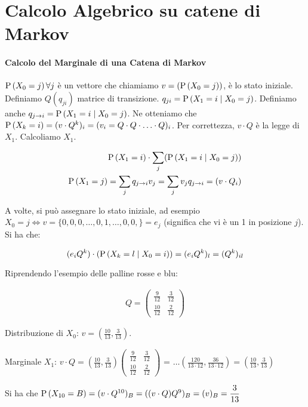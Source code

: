 \section{Calcolo Algebrico su catene di Markov}

\paragraph{Calcolo del Marginale di una Catena di Markov}
$ \text{P}\left(X_0 = j\right) \forall j $ è un vettore che chiamiamo $ v = (\text{P}\left(X_0 = j\right)) $, è lo stato iniziale. Definiamo $ Q(q_{ji}) $ matrice di transizione. $ q_{ji} = \text{P}\left(X_1 = i \mid X_0 = j\right) $. Definiamo anche $ q_{j \to i} = \text{P}\left(X_1 = i \mid X_0 = j\right) $. Ne otteniamo che $ \text{P}\left(X_k = i\right) = (v \cdot Q^k)_i = (v_i = Q \cdot Q \cdot \hdots \cdot Q)_i $. Per correttezza, $ v \cdot Q $ è la legge di $ X_1 $. Calcoliamo $ X_1 $.

\begin{equation*}
	\begin{aligned}
	\text{P}\left(X_1 = i\right) \cdot \sum_j (\text{P}\left(X_1 = i \mid X_0 = j\right)) \\
	\text{P}\left(X_1 = j\right) = \sum_j q_{j \to i} v_j = \sum_j v_j q_{j \to i} = (v \cdot Q_i)
	\end{aligned}
\end{equation*}


A volte, si può assegnare lo stato iniziale, ad esempio $ X_0 = j \iff v = \{0, 0, 0, \hdots, 0, 1, \hdots, 0, 0,\} = e_j $ (significa che vi è un 1 in posizione $ j $). Si ha che:

\begin{equation*}
(e_i Q^k) \cdot (\text{P}\left(X_k = l \mid X_0 = i\right) ) = (e_i Q^k)_l = (Q^k)_{il}
\end{equation*}

\begin{exmp}
	Riprendendo l'esempio delle palline rosse e blu:
	
	\begin{equation*}
	\begin{aligned}
	Q=\begin{pmatrix}
	\frac{9}{12} & \frac{3}{12} \\
	\frac{10}{12} & \frac{2}{12}
	\end{pmatrix}
	\end{aligned}
	\end{equation*}
	
	Distribuzione di $ X_0 $: $ v = (\frac{10}{13}, \frac{3}{13}) $.
	
	Marginale $ X_1 $: $ v \cdot Q = (\frac{10}{13}, \frac{3}{13})\begin{pmatrix}
	\frac{9}{12} & \frac{3}{12} \\
	\frac{10}{12} & \frac{2}{12}
	\end{pmatrix} $ = $\hdots (\frac{120}{13 \cdot 12}, \frac{36}{13 \cdot 12}) = \left( \frac{10}{13}, \frac{3}{13} \right)$
	
	Si ha che $ \text{P}\left(X_{10} = B\right) = (v \cdot Q^{10})_B = ((v \cdot Q) Q^9)_B = (v)_B = {\dfrac{3}{13}} $
	
\end{exmp}

